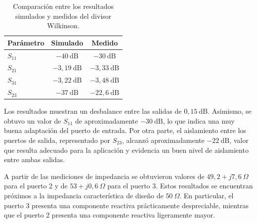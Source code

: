 \begin{table}[H]
\centering
\begin{tabular}{lcc}
\hline
\textbf{Parámetro} & \textbf{Simulado} & \textbf{Medido} \\
\hline
$S_{11}$ & $-40~\mathrm{dB}$ & $-30~\mathrm{dB}$ \\
$S_{21}$ & $-3{,}19~\mathrm{dB}$ & $-3{,}33~\mathrm{dB}$ \\
$S_{31}$ & $-3{,}22~\mathrm{dB}$ & $-3{,}48~\mathrm{dB}$ \\
$S_{23}$ & $-37~\mathrm{dB}$ & $-22{,}6~\mathrm{dB}$ \\
\hline
\end{tabular}
\caption{Comparación entre los resultados simulados y medidos del divisor Wilkinson.}
\label{tab:resultados_wilkinson}
\end{table}
Los resultados muestran un desbalance entre las salidas de $0,15~\mathrm{dB}$. Asimismo, se obtuvo un valor de $S_{11}$ de aproximadamente $-30~\mathrm{dB}$, lo que indica una muy buena adaptación del puerto de entrada. Por otra parte, el aislamiento entre los puertos de salida, representado por $S_{23}$, alcanzó aproximadamente $-22~\mathrm{dB}$, valor que resulta adecuado para la aplicación y evidencia un buen nivel de aislamiento entre ambas salidas.

A partir de las mediciones de impedancia se obtuvieron valores de $49,2+j7,6~\Omega$ para el puerto 2 y de $53+j0,6~\Omega$ para el puerto 3. Estos resultados se encuentran próximos a la impedancia característica de diseño de $50~\Omega$. En particular, el puerto 3 presenta una componente reactiva prácticamente despreciable, mientras que el puerto 2 presenta una componente reactiva ligeramente mayor.